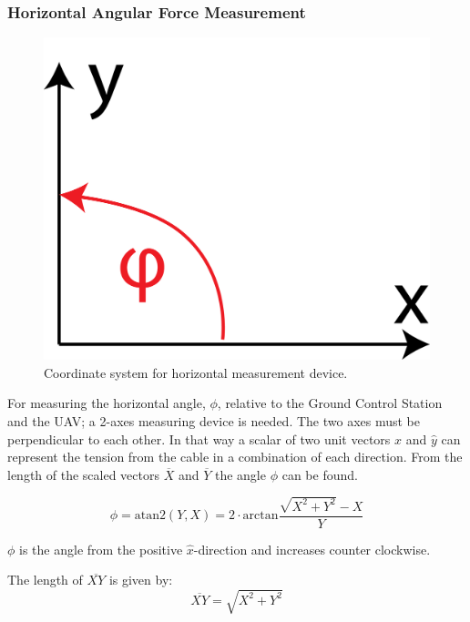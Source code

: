    

\subsubsection{Horizontal Angular Force Measurement}
\label{sec:horizontalMeasurementAnalysis}
\begin{figure}[hbtp]
\centering
\includegraphics[scale=0.25]{graphics/horizontal_coordinatesystem.png}
\caption{Coordinate system for horizontal measurement device.}
\end{figure}

For measuring the horizontal angle, $\phi$, relative to the Ground Control Station and the UAV; a 2-axes measuring device is needed. The two axes must be perpendicular to each other. In that way a scalar of two unit vectors $\hat{x}$ and $\hat{y}$ can represent the tension from the cable in a combination of each direction. 
From the length of the scaled vectors $\overline{X}$ and $\overline{Y}$ the angle $\phi$ can be found.

\begin{equation}
\phi = \mathrm{atan2} (Y,  X) = 2 \cdot \mathrm{arctan} \frac{\sqrt{X^2+Y^2}-X}{Y}
\end{equation}

\noindent
$\phi$ is the angle from the positive $\hat{x}$-direction and increases counter clockwise. 

\noindent
The length of $\overline{XY}$ is given by:
\begin{equation}
\overline{XY} = \sqrt{X^2+Y^2}
\end{equation}

